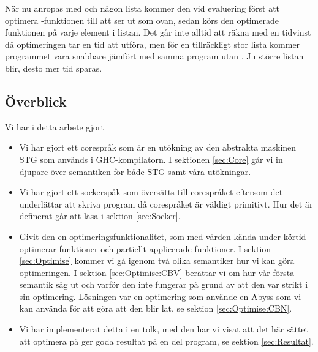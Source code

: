 \documentclass[Rapport]{subfiles}
\begin{document}
När nu  anropas med  och någon lista  kommer
den vid evaluering först att optimera -funktionen till att 
ser ut som  ovan, sedan körs den optimerade funktionen på varje
element i listan. Det går inte alltid att räkna med en tidvinst då optimeringen tar en  tid att utföra,
men för en tillräckligt stor lista 
 kommer programmet vara snabbare jämfört med samma program utan .
Ju större listan  blir, desto mer tid sparas.



\subsection{Överblick}


Vi har i detta arbete gjort
\begin{itemize}
    \item Vi har gjort ett corespråk som är en utökning av den abstrakta maskinen STG \cite{stg} som används i 
          GHC-kompilatorn. I sektionen \ref{sec:Core} går vi in djupare över semantiken för både STG samt våra utökningar. 
    \item Vi har gjort ett sockerspåk som översätts till corespråket eftersom det underlättar 
          att skriva program då corespråket är väldigt primitivt. Hur det är definerat
          går att läsa i sektion \ref{sec:Socker}.
    \item Givit den en optimeringsfunktionalitet, som med värden kända under körtid
          optimerar funktioner och partiellt applicerade funktioner. I sektion \ref{sec:Optimise}
          kommer vi gå igenom två olika semantiker hur vi kan göra optimeringen.
          I sektion \ref{sec:Optimise:CBV} berättar vi om hur vår första semantik
          såg ut och varför den inte fungerar på grund av att den var strikt i sin
          optimering. Lösningen var en optimering som använde en Abyss som vi kan
          använda för att göra att den blir lat, se sektion \ref{sec:Optimise:CBN}. 
    \item Vi har implementerat detta i en tolk, med den har vi visat att det här sättet 
            att optimera på ger goda resultat på en del program, se sektion \ref{sec:Resultat}.
\end{itemize}

\overviewIntro
{}
\end{document}
